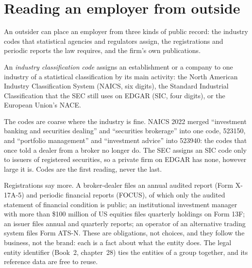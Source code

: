 \section{Reading an employer from outside}

An outsider can place an employer from three kinds of public record: the industry codes that statistical agencies and
regulators assign, the registrations and periodic reports the law requires, and the firm's own publications.

\begin{definition}\label{def:in:a-map-of-the-industry:code}
An \emph{industry classification code} assigns an establishment or a company to one
industry of a statistical classification by its main activity: the North American Industry Classification System
(NAICS, six digits), the Standard Industrial Classification that the SEC still uses on EDGAR (SIC, four digits), or the
European Union's NACE.
\end{definition}

The codes are coarse where the industry is fine. NAICS 2022 merged ``investment banking and securities dealing'' and
``securities brokerage'' into one code, 523150, and ``portfolio management'' and ``investment advice'' into 523940: the
codes that once told a dealer from a broker no longer do. The SEC assigns an SIC code only to issuers of registered
securities, so a private firm on EDGAR has none, however large it is. Codes are the first reading, never the last.

Registrations say more. A broker-dealer files an annual audited report (Form X-17A-5) and periodic financial reports
(FOCUS), of which only the audited statement of financial condition is public; an institutional investment manager with more than \$100 million of US equities files quarterly holdings on
Form 13F; an issuer files annual and quarterly reports; an operator of an alternative trading system files Form ATS-N.
These are obligations, not choices, and they follow the business, not the brand: each is a fact about what the entity
does. The legal entity identifier (Book~2, chapter~28) ties the entities of a group together, and its reference data are
free to reuse.


